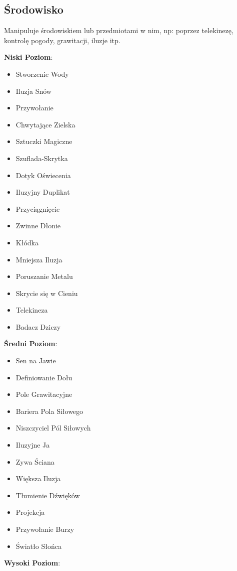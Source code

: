 \subsection{Środowisko}

Manipuluje środowiskiem lub przedmiotami w nim, np: poprzez telekinezę,  kontrolę pogody, grawitacji, iluzje itp.

\textbf{Niski Poziom}:

\begin{itemize}
\item Stworzenie Wody
\item Iluzja Snów
\item Przywołanie
\item Chwytające Zielska
\item Sztuczki Magiczne
\item Szuflada-Skrytka
\item Dotyk Oświecenia
\item Iluzyjny Duplikat
\item Przyciągnięcie
\item Zwinne Dłonie
\item Kłódka
\item Mniejsza Iluzja
\item Poruszanie Metalu
\item Skrycie się w Cieniu
\item Telekineza
\item Badacz Dziczy
\end {itemize}

\textbf{Średni Poziom}:

\begin{itemize}
\item Sen na Jawie
\item Definiowanie Dołu
\item Pole Grawitacyjne
\item Bariera Pola Siłowego
\item Niszczyciel Pól Siłowych
\item Iluzyjne Ja
\item Zywa Ściana
\item Większa Iluzja
\item Tłumienie Dźwięków
\item Projekcja
\item Przywołanie Burzy
\item Światło Słońca
\end {itemize}

\textbf{Wysoki Poziom}:

